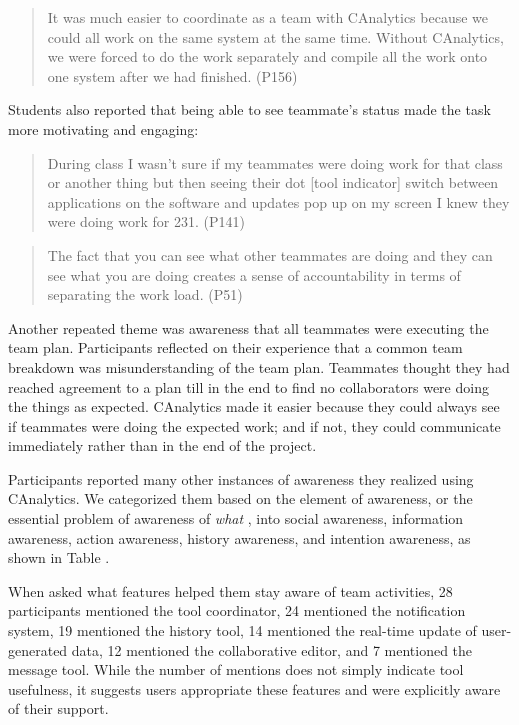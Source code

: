 \begin{quote}
It was much easier to coordinate as a team with CAnalytics because we
could all work on the same system at the same time. Without CAnalytics,
we were forced to do the work separately and compile all the work onto
one system after we had finished. (P156)
\end{quote}

Students also reported that being able to see teammate's status made the
task more motivating and engaging:

\begin{quote}
During class I wasn't sure if my teammates were doing work for that
class or another thing but then seeing their dot {[}tool indicator{]}
switch between applications on the software and updates pop up on my
screen I knew they were doing work for 231. (P141)
\end{quote}

\begin{quote}
The fact that you can see what other teammates are doing and they can
see what you are doing creates a sense of accountability in terms of
separating the work load. (P51)
\end{quote}

Another repeated theme was awareness that all teammates were executing
the team plan. Participants reflected on their experience that a common
team breakdown was misunderstanding of the team plan. Teammates thought
they had reached agreement to a plan till in the end to find no
collaborators were doing the things as expected. CAnalytics made it
easier because they could always see if teammates were doing the
expected work; and if not, they could communicate immediately rather
than in the end of the project.

Participants reported many other instances of awareness they realized
using CAnalytics. We categorized them based on the element of awareness,
or the essential problem of awareness of \emph{what}
\autocite{Schmidt2002}, into social awareness, information awareness,
action awareness, history awareness, and intention awareness, as shown
in Table \autocite{tab:awareness}.

When asked what features helped them stay aware of team activities, 28
participants mentioned the tool coordinator, 24 mentioned the
notification system, 19 mentioned the history tool, 14 mentioned the
real-time update of user-generated data, 12 mentioned the collaborative
editor, and 7 mentioned the message tool. While the number of mentions
does not simply indicate tool usefulness, it suggests users appropriate
these features and were explicitly aware of their support.

